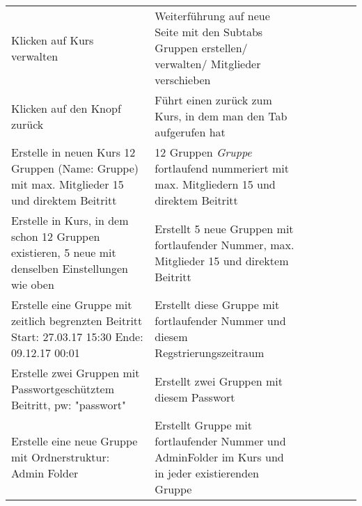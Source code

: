 \begin{table}[]
\begin{tabular}{p{6cm}p{7cm}p{3cm}llll}
		Klicken auf Kurs verwalten                                                                                                            & Weiterführung auf neue Seite mit den Subtabs Gruppen erstellen/ verwalten/ Mitglieder verschieben                                                                & \checkmark           &  &  &  \\
		Klicken auf den Knopf zurück                                                                                                         & Führt einen zurück zum Kurs, in dem man den Tab aufgerufen hat                                                                                                    & 
		\checkmark          &  &  &  \\
		Erstelle in neuen Kurs 12 Gruppen (Name: Gruppe) mit max. Mitglieder 15 und direktem Beitritt                                        & 12 Gruppen \textit{Gruppe} fortlaufend nummeriert mit max. Mitgliedern 15 und direktem Beitritt                                                                         & \checkmark           &  &  &  \\
		Erstelle in Kurs, in dem schon 12 Gruppen existieren, 5 neue mit denselben Einstellungen wie oben                                     & Erstellt 5 neue Gruppen mit fortlaufender Nummer, max. Mitglieder 15 und direktem Beitritt                                                                        & \checkmark           &  &  &  \\
		Erstelle eine Gruppe mit zeitlich begrenzten Beitritt Start: 27.03.17 15:30 Ende: 09.12.17 00:01                                     & Erstellt diese Gruppe mit fortlaufender Nummer und diesem Regstrierungszeitraum                                                                                   & \checkmark           &  &  &  \\
		Erstelle zwei Gruppen mit Passwortgeschütztem Beitritt, pw: "passwort"                                                               & Erstellt zwei Gruppen mit diesem Passwort                                                                                                                        & \checkmark          &  &  &  \\
		Erstelle eine neue Gruppe mit Ordnerstruktur: Admin Folder                                                                           & Erstellt Gruppe mit fortlaufender Nummer und AdminFolder im Kurs und in jeder existierenden Gruppe                                                               & \checkmark           &  &  &  \\

\end{tabular}
\end{table}
